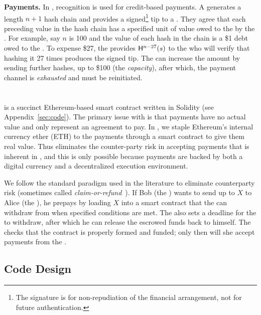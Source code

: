 \textbf{Payments.} In \pw, recognition is used for credit-based payments. A \make generates a length $n+1$ hash chain and provides a signed\footnote{The signature is for non-repudiation of the financial arrangement, not for future authentication.} tip to a \take. They agree that each preceding value in the hash chain has a specified unit of value owed to the \take by the \make. For example, say $n$ is 100 and the value of each hash in the chain is a \$1 debt owed to the \take. To expense \$27, the \make provides $\mathsf{H}^{n-27}(s)$ to the \take who will verify that hashing it 27 times produces the signed tip. The \make can increase the amount by sending further hashes, up to \$100 (the \textit{capacity}), after which, the payment channel is \textit{exhausted} and must be reinitiated.


\section{\ew}

\ew is a succinct Ethereum-based smart contract written in Solidity (see Appendix~\ref{sec:code}). The primary issue with \pw is that payments have no actual value and only represent an agreement to pay. In \ew, we staple Ethereum's internal currency ether (ETH) to the payments through a smart contract to give them real value. Thus \ew eliminates the counter-party risk in accepting payments that is inherent in \pw, and this is only possible because payments are backed by both a digital currency and a decentralized execution environment. 

We follow the standard paradigm used in the literature to eliminate counterparty risk (sometimes called \textit{claim-or-refund}~\cite{BK14}). If Bob (the \make) wants to send up to $X$ \eth to Alice (the \take), he prepays by loading $X$ \eth into a smart contract that the \take can withdraw from when specified conditions are met. The \make also sets a deadline for the \take to withdraw, after which he can release the escrowed funds back to himself. The \take checks that the contract is properly formed and funded; only then will she accept payments from the \make.

\subsection{Code Design}

